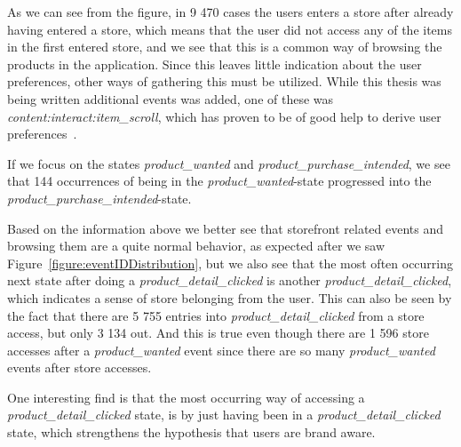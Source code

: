 As we can see from the figure, in 9 470 cases the users enters a store after
already having entered a store, which means that the user did not access any of
the items in the first entered store, and we see that this is a common way of
browsing the products in the application. Since this leaves little indication
about the user preferences, other ways of gathering this must be utilized.
While this thesis was being written additional events was added, one of these
was \emph{content:interact:item\_scroll}, which has proven to be of good help
to derive user preferences~\cite{Claypool01inferringuser}.

If we focus on the states \emph{product\_wanted} and
\emph{product\_purchase\_intended}, we see that 144 occurrences of being in the
\emph{product\_wanted}-state progressed into the
\emph{product\_purchase\_intended}-state.

Based on the information above we better see that storefront related events and browsing them are a quite normal behavior, as expected after we saw Figure~\ref{figure:eventIDDistribution}, but we also see that the most often occurring next state after doing a \emph{product\_detail\_clicked} is another \emph{product\_detail\_clicked}, which indicates a sense of store belonging from the user.
This can also be seen by the fact that there are 5 755 entries into \emph{product\_detail\_clicked} from a store access, but only 3 134 out. And this is true even though there are 1 596 store accesses after a \emph{product\_wanted} event since there are so many \emph{product\_wanted} events after store accesses.

One interesting find is that the most occurring way of accessing a \emph{product\_detail\_clicked} state, is by just having been in a \emph{product\_detail\_clicked} state, which strengthens the hypothesis that users are brand aware.
